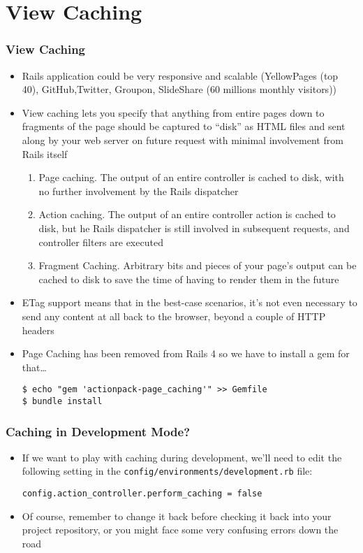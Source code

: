 \documentclass{beamer}
\begin{document}
\section{View Caching}
\begin{frame}
\frametitle{View Caching}
\begin{itemize}
\item Rails application could be very responsive and scalable (YellowPages (top 40), GitHub,Twitter, Groupon, SlideShare (60 millions monthly visitors))
\item View caching lets you specify that anything from entire pages down to fragments of the page should be captured to ``disk'' as HTML files and sent along by your web server on future request with minimal involvement from Rails itself
\begin{enumerate}
\item Page caching. The output of an entire controller is cached to disk, with no further involvement by the Rails dispatcher
\item Action caching. The output of an entire controller action is cached to disk, but he Rails dispatcher is still involved in subsequent requests, and controller filters are executed
\item Fragment Caching. Arbitrary bits and pieces of your page’s output can be cached to disk
to save the time of having to render them in the future
\end{enumerate}
\item ETag support means that in the best-case scenarios, it's not even necessary to send any content at all back to the browser, beyond a couple of HTTP headers

\item Page Caching has been removed from Rails 4 so we have to install a gem for that\dots
\lstset{language=shell}
\begin{lstlisting}[escapechar=!]
$ echo "gem 'actionpack-page_caching'" >> Gemfile
$ bundle install
\end{lstlisting}
\end{itemize}

\end{frame}
\begin{frame}[fragile]
\frametitle{Caching in Development Mode?}
\begin{itemize}
\item If we want to play with caching during development, we’ll need to edit the following setting in the \texttt{config/environments/development.rb} file:

\lstset{language=shell}
\begin{lstlisting}
config.action_controller.perform_caching = false
\end{lstlisting}

\item Of course, remember to change it back before checking it back into your project repository,
or you might face some very confusing errors down the road
\end{itemize}

\end{frame}
\end{document}
